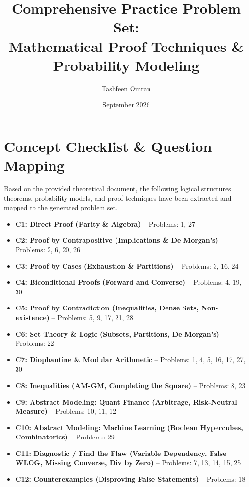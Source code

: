 \documentclass[11pt]{article}
\title{Comprehensive Practice Problem Set:\\ Mathematical Proof Techniques \& Probability Modeling}
\author{Tashfeen Omran}
\date{September 2026}
\begin{document}
\maketitle

\tableofcontents
\newpage

\section{Concept Checklist \& Question Mapping}
\label{sec:checklist_start}

Based on the provided theoretical document, the following logical structures, theorems, probability models, and proof techniques have been extracted and mapped to the generated problem set.

\begin{itemize}
    \item \textbf{C1: Direct Proof (Parity \& Algebra)} -- Problems: 1, 27
    \item \textbf{C2: Proof by Contrapositive (Implications \& De Morgan's)} -- Problems: 2, 6, 20, 26
    \item \textbf{C3: Proof by Cases (Exhaustion \& Partitions)} -- Problems: 3, 16, 24
    \item \textbf{C4: Biconditional Proofs (Forward and Converse)} -- Problems: 4, 19, 30
    \item \textbf{C5: Proof by Contradiction (Inequalities, Dense Sets, Non-existence)} -- Problems: 5, 9, 17, 21, 28
    \item \textbf{C6: Set Theory \& Logic (Subsets, Partitions, De Morgan's)} -- Problems: 22
    \item \textbf{C7: Diophantine \& Modular Arithmetic} -- Problems: 1, 4, 5, 16, 17, 27, 30
    \item \textbf{C8: Inequalities (AM-GM, Completing the Square)} -- Problems: 8, 23
    \item \textbf{C9: Abstract Modeling: Quant Finance (Arbitrage, Risk-Neutral Measure)} -- Problems: 10, 11, 12
    \item \textbf{C10: Abstract Modeling: Machine Learning (Boolean Hypercubes, Combinatorics)} -- Problems: 29
    \item \textbf{C11: Diagnostic / Find the Flaw (Variable Dependency, False WLOG, Missing Converse, Div by Zero)} -- Problems: 7, 13, 14, 15, 25
    \item \textbf{C12: Counterexamples (Disproving False Statements)} -- Problems: 18
\end{itemize}
\end{document}
